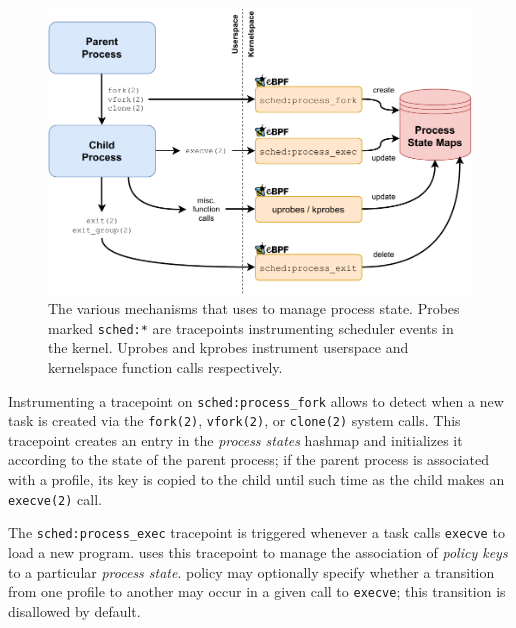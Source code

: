\begin{figure}[htbp]
  \centering
  \includegraphics[width=0.8\linewidth]{figs/bpfbox/process-lifecycle.pdf}
  \caption[The various mechanisms that \bpfbox{} uses to manage process state]{
    The various mechanisms that \bpfbox{} uses to manage process state.
    Probes marked \texttt{sched:*} are tracepoints instrumenting scheduler events
    in the kernel. Uprobes and kprobes instrument userspace
    and kernelspace function calls respectively.
  }%
  \label{fig:bpfbox-process-lifecycle}
\end{figure}


Instrumenting a tracepoint on \texttt{sched:process\_fork} allows \bpfbox{} to
detect when a new task is created via the \texttt{fork(2)}, \texttt{vfork(2)}, or
\texttt{clone(2)} system calls. This tracepoint creates an entry in the \textit{process
states} hashmap and initializes it according to the state of the parent process; if the
parent process is associated with a \bpfbox{} profile, its key is copied to the child
until such time as the child makes an \texttt{execve(2)} call.

The \texttt{sched:process\_exec} tracepoint is triggered whenever a task calls
\texttt{execve} to load a new program.  \bpfbox{} uses this tracepoint to manage the
association of \textit{policy keys} to a particular \textit{process state}.  \bpfbox{}
policy may optionally specify whether a transition from one profile to another may occur
in a given call to \texttt{execve}; this transition is disallowed by default.

